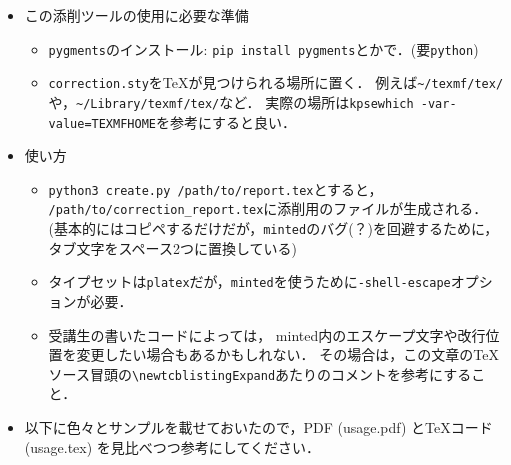 \documentclass[dvipdfmx]{jsarticle}
\begin{document}
\begin{itemize}
  \item この添削ツールの使用に必要な準備
    \begin{itemize}
      \item \verb|pygments|のインストール: \verb|pip install pygments|とかで．(要\verb|python|)
      \item \verb|correction.sty|を\TeX が見つけられる場所に置く．
        例えば\verb|~/texmf/tex/|や，\verb|~/Library/texmf/tex/|など．
        実際の場所は\verb|kpsewhich -var-value=TEXMFHOME|を参考にすると良い．
    \end{itemize}
  \item 使い方
    \begin{itemize}
      \item \verb|python3 create.py /path/to/report.tex|とすると，
        \verb|/path/to/correction_report.tex|に添削用のファイルが生成される．
        (基本的にはコピペするだけだが，\verb|minted|のバグ(？)を回避するために，タブ文字をスペース2つに置換している)
      \item タイプセットは\verb|platex|だが，\verb|minted|を使うために\verb|-shell-escape|オプションが必要．
      \item 受講生の書いたコードによっては，
        minted内のエスケープ文字や改行位置を変更したい場合もあるかもしれない．
        その場合は，この文章の\TeX ソース冒頭の\verb|\newtcblistingExpand|あたりのコメントを参考にすること．

    \end{itemize}
  \item 以下に色々とサンプルを載せておいたので，PDF (usage.pdf) と\TeX コード (usage.tex) を見比べつつ参考にしてください．
\end{itemize}

\vspace{30pt}

\end{document}
